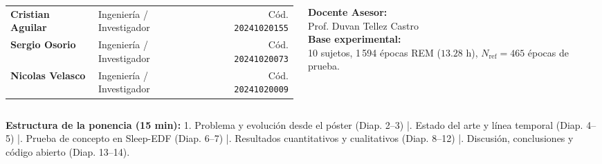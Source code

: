 \documentclass[aspectratio=169,9pt]{beamer}
\begin{document}
\begin{frame}[plain]
  \begin{columns}[T,onlytextwidth]
    \begin{column}{0.62\textwidth}
      \begin{tcolorbox}[basecard, title={\scriptsize\bfseries Autores del Proyecto}, colbacktitle=UDNavy, coltitle=white]
        \scriptsize
        \begin{tabularx}{\linewidth}{@{}l Y r@{}}
          \textbf{Cristian Aguilar} & Ingenier\'ia / Investigador & C\'od. \texttt{20241020155} \\[0.1cm]
          \textbf{Sergio Osorio} & Ingenier\'ia / Investigador & C\'od. \texttt{20241020073} \\[0.1cm]
          \textbf{Nicolas Velasco} & Ingenier\'ia / Investigador & C\'od. \texttt{20241020009} \\
        \end{tabularx}
      \end{tcolorbox}
    \end{column}
    \begin{column}{0.35\textwidth}
      \begin{tcolorbox}[tealcard, title={\scriptsize\bfseries Direcci\'on Acad\'emica}, colbacktitle=UDTeal!85!black, coltitle=white]
        \scriptsize
        \textbf{Docente Asesor:}\\
        Prof. Duvan Tellez Castro\\[0.15cm]
        \textbf{Base experimental:}\\
        10 sujetos, 1\,594 \'epocas REM ($13.28\text{ h}$), $N_{\text{ref}}=465$ \'epocas de prueba.
      \end{tcolorbox}
    \end{column}
  \end{columns}

  \vspace{0.15cm}
  \begin{tcolorbox}[basecard, colback=LightBg]
    \tiny\color{MutedGray}
    \textbf{Estructura de la ponencia (15 min):}
    1. Problema y evoluci\'on desde el p\'oster (Diap. 2--3) \quad|. Estado del arte y l\'inea temporal (Diap. 4--5) \quad|. Prueba de concepto en Sleep-EDF (Diap. 6--7) \quad|. Resultados cuantitativos y cualitativos (Diap. 8--12) \quad|. Discusi\'on, conclusiones y c\'odigo abierto (Diap. 13--14).
  \end{tcolorbox}
\end{frame}
\end{document}

